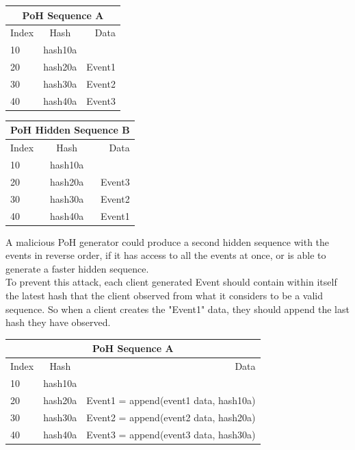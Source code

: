 \documentclass[12pt]{article}
\begin{document}
\begin{center}
  \begin{tabular}{ | l | c | r |}
    \hline
    \multicolumn{3}{|c|}{PoH Sequence A} \\
    \hline
    Index & Hash & Data \\ \hline
    10 & hash10a & \\ \hline
    20 & hash20a & Event1 \\ \hline
    30 & hash30a & Event2 \\ \hline
    40 & hash40a & Event3 \\
    \hline
    \end{tabular}
  \begin{tabular}{ | l | c | r |}
    \hline
    \multicolumn{3}{|c|}{PoH Hidden Sequence B} \\
    \hline
    Index & Hash & Data \\ \hline
    10 & hash10a & \\ \hline
    20 & hash20a & Event3 \\ \hline
    30 & hash30a & Event2 \\ \hline
    40 & hash40a & Event1 \\
    \hline
    \end{tabular}
\end{center}

A malicious PoH generator could produce a second hidden sequence with the events in reverse order, if it has access to all the events at once, or is able to generate a faster hidden sequence.\\

To prevent this attack, each client generated Event should contain within itself the latest hash that the client observed from what it considers to be a valid sequence. So when a client creates the "Event1" data, they should append the last hash they have observed.\\

\begin{center}
  \begin{tabular}{ | l | c | r |}
    \hline
    \multicolumn{3}{|c|}{PoH Sequence A} \\
    \hline
    Index & Hash & Data \\ \hline
    10 & hash10a & \\ \hline
    20 & hash20a & Event1 = append(event1 data, hash10a) \\ \hline
    30 & hash30a & Event2 = append(event2 data, hash20a) \\ \hline
    40 & hash40a & Event3 = append(event3 data, hash30a) \\
    \hline
    \end{tabular}
\end{center}
\end{document}
